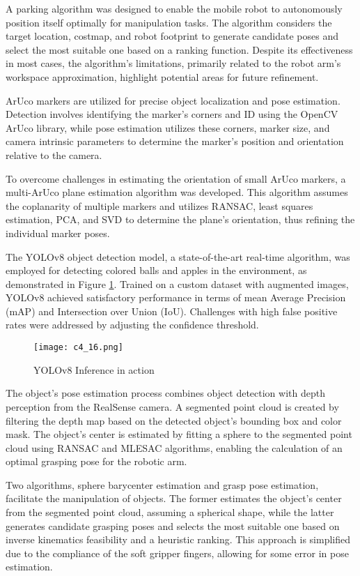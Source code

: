 A parking algorithm was designed to enable the mobile robot to autonomously position itself optimally
for manipulation tasks. The algorithm considers the target location, costmap, and robot footprint to generate 
candidate poses and select the most suitable one based on a ranking function. Despite its effectiveness in most 
cases, the algorithm's limitations, primarily related to the robot arm's workspace approximation, highlight
potential areas for future refinement.

ArUco markers are utilized for precise object localization and pose estimation. 
Detection involves identifying the marker's corners and ID using the OpenCV ArUco library, while pose estimation
utilizes these corners, marker size, and camera intrinsic parameters to determine the marker's position and
orientation relative to the camera.

To overcome challenges in estimating the orientation of small ArUco markers, a multi-ArUco plane estimation 
algorithm was developed. This algorithm assumes the coplanarity of multiple markers and utilizes RANSAC, 
least squares estimation, PCA, and SVD to determine the plane's orientation, thus refining the individual 
marker poses.

The YOLOv8 object detection model, a state-of-the-art real-time algorithm, was employed for detecting colored
balls and apples in the environment, as demonstrated in Figure \ref{fig:yolov8}.
Trained on a custom dataset with augmented images, YOLOv8 achieved 
satisfactory performance in terms of mean Average Precision (mAP) and Intersection over Union (IoU).
Challenges with high false positive rates were addressed by adjusting the confidence threshold.

\begin{figure}[H]
    \centering
    \texttt{[image: c4\_16.png]}
    \caption{YOLOv8 Inference in action}
    \label{fig:yolov8}
\end{figure}

The object's pose estimation process combines object detection with depth perception from the RealSense camera.
A segmented point cloud is created by filtering the depth map based on the detected object's bounding box and color mask.
The object's center is estimated by fitting a sphere to the segmented point cloud using RANSAC and MLESAC algorithms,
enabling the calculation of an optimal grasping pose for the robotic arm.

Two algorithms, sphere barycenter estimation and grasp pose estimation, facilitate the manipulation of objects. The former estimates the object's center from the segmented point cloud, assuming a spherical shape, 
while the latter generates candidate grasping poses and selects the most suitable one based on inverse kinematics 
feasibility and a heuristic ranking. This approach is simplified due to the compliance of the soft gripper fingers, 
allowing for some error in pose estimation.


